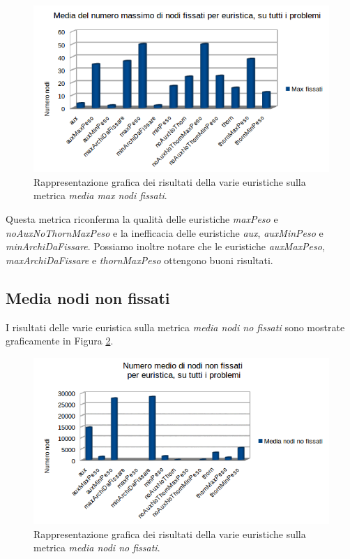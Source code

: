 \begin{figure}[H]
\includegraphics[width=\textwidth]{res/img/mediaMaxFissati.png}
\caption{Rappresentazione grafica dei risultati della varie euristiche sulla metrica \textit{media max nodi fissati}.}
\label{fig:mediaMaxNodiFissati}
\end{figure}

Questa metrica riconferma la qualità delle euristiche \textit{maxPeso} e \textit{noAuxNoThornMaxPeso} e la inefficacia delle euristiche \textit{aux}, \textit{auxMinPeso} e \textit{minArchiDaFissare}. Possiamo inoltre notare che le euristiche \textit{auxMaxPeso}, \textit{maxArchiDaFissare} e \textit{thornMaxPeso} ottengono buoni risultati.

\subsection{Media nodi non fissati}
I risultati delle varie euristica sulla metrica \textit{media nodi no fissati} sono mostrate graficamente in Figura \ref{fig:mediaNodiNoFissati}.

\begin{figure}[H]
\includegraphics[width=\textwidth]{res/img/mediaNodiNoFissati.png}
\caption{Rappresentazione grafica dei risultati della varie euristiche sulla metrica \textit{media nodi no fissati}.}
\label{fig:mediaNodiNoFissati}
\end{figure}

